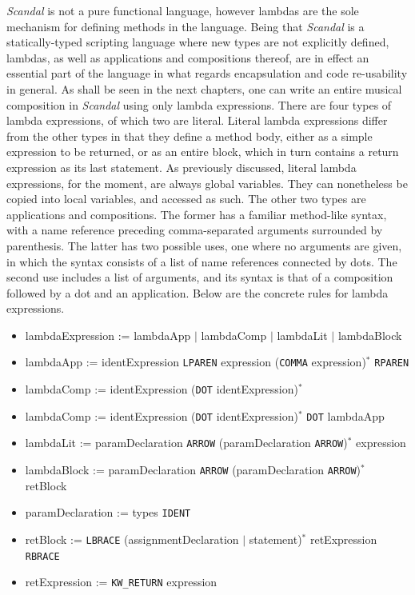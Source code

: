 \emph{Scandal} is not a pure functional language, however lambdas are the sole mechanism for defining methods in the language. Being that \emph{Scandal} is a statically-typed scripting language where new types are not explicitly defined, lambdas, as well as applications and compositions thereof, are in effect an essential part of the language in what regards encapsulation and code re-usability in general. As shall be seen in the next chapters, one can write an entire musical composition in \emph{Scandal} using only lambda expressions. There are four types of lambda expressions, of which two are literal. Literal lambda expressions differ from the other types in that they define a method body, either as a simple expression to be returned, or as an entire block, which in turn contains a return expression as its last statement. As previously discussed, literal lambda expressions, for the moment, are always global variables. They can nonetheless be copied into local variables, and accessed as such. The other two types are applications and compositions. The former has a familiar method-like syntax, with a name reference preceding comma-separated arguments surrounded by parenthesis. The latter has two possible uses, one where no arguments are given, in which the syntax consists of a list of name references connected by dots. The second use includes a list of arguments, and its syntax is that of a composition followed by a dot and an application. Below are the concrete rules for lambda expressions.

\begin{itemize}
	\item lambdaExpression := lambdaApp $|$ lambdaComp $|$ lambdaLit $|$ lambdaBlock
	\item lambdaApp := identExpression \texttt{LPAREN} expression (\texttt{COMMA} expression)$^*$ \texttt{RPAREN}
	\item lambdaComp := identExpression (\texttt{DOT} identExpression)$^*$
	\item lambdaComp := identExpression (\texttt{DOT} identExpression)$^*$ \texttt{DOT} lambdaApp
	\item lambdaLit := paramDeclaration \texttt{ARROW} (paramDeclaration \texttt{ARROW})$^*$ expression
	\item lambdaBlock := paramDeclaration \texttt{ARROW} (paramDeclaration \texttt{ARROW})$^*$ retBlock
	\item paramDeclaration := types \texttt{IDENT}
	\item retBlock := \texttt{LBRACE} (assignmentDeclaration $|$ statement)$^*$ retExpression \texttt{RBRACE}
	\item retExpression := \texttt{KW\_RETURN} expression
\end{itemize}